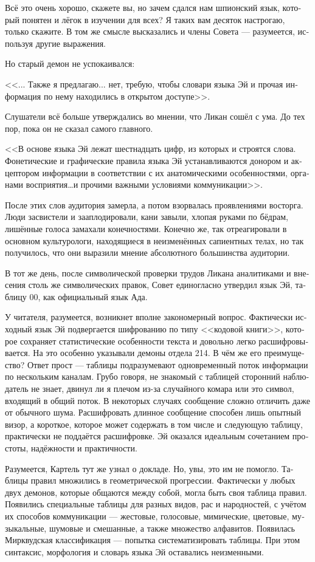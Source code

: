 \documentclass[a4paper,12pt,fleqn]{book}\usepackage{cooltooltips}\usepackage{polyglossia}\setdefaultlanguage[babelshorthands=true]{russian}\setotherlanguage{english}\defaultfontfeatures{Ligatures=TeX,Mapping=tex-text} \usepackage{xcolor}\definecolor{lightgray}{HTML}{bbbbbb}\color{lightgray}\newcommand{\ml}[3]{\textenglish{\textcolor{black}{#3}}}
\begin{document}
{Всё это очень хорошо, скажете вы, но зачем сдался нам шпионский язык, который понятен и лёгок в изучении для всех?
Я таких вам десяток настрогаю, только скажите.
В том же смысле высказались и члены Совета --- разумеется, используя другие выражения.

Но старый демон не успокаивался:

<<... Также я предлагаю... нет, требую, чтобы словари языка Эй и прочая информация по нему находились в открытом доступе>>.

Слушатели всё больше утверждались во мнении, что Ликан сошёл с ума.
До тех пор, пока он не сказал самого главного.

<<В основе языка Эй лежат шестнадцать цифр, из которых и строятся слова.
Фонетические и графические правила языка Эй устанавливаются донором и акцептором информации в соответствии с их анатомическими особенностями, органами восприятия\ldots и прочими важными условиями коммуникации>>.

После этих слов аудитория замерла, а потом взорвалась проявлениями восторга.
Люди засвистели и зааплодировали, кани завыли, хлопая руками по бёдрам, лишённые голоса замахали конечностями.
Конечно же, так отреагировали в основном культурологи, находящиеся в неизменённых сапиентных телах, но так получилось, что они выразили мнение абсолютного большинства аудитории.

В тот же день, после символической проверки трудов Ликана аналитиками и внесения столь же символических правок, Совет единогласно утвердил язык Эй, таблицу 00, как официальный язык Ада.

У читателя, разумеется, возникнет вполне закономерный вопрос.
Фактически исходный язык Эй подвергается шифрованию по типу <<кодовой книги>>, которое сохраняет статистические особенности текста и довольно легко расшифровывается.
На это особенно указывали демоны отдела 214.
В чём же его преимущество?
Ответ прост --- таблицы подразумевают одновременный поток информации по нескольким каналам.
Грубо говоря, не знакомый с таблицей сторонний наблюдатель не знает, двинул ли я плечом из-за случайного комара или это символ, входящий в общий поток.
В некоторых случаях сообщение сложно отличить даже от обычного шума.
Расшифровать длинное сообщение способен лишь опытный визор, а короткое, которое может содержать в том числе и следующую таблицу, практически не поддаётся расшифровке.
Эй оказался идеальным сочетанием простоты, надёжности и практичности.

Разумеется, Картель тут же узнал о докладе.
Но, увы, это им не помогло.
Таблицы правил множились в геометрической прогрессии.
Фактически у любых двух демонов, которые общаются между собой, могла быть своя таблица правил.
Появились специальные таблицы для разных видов, рас и народностей, с учётом их способов коммуникации --- жестовые, голосовые, мимические, цветовые, музыкальные, шумовые и смешанные, а также множество алфавитов.
Появилась Мирквудская классификация --- попытка систематизировать таблицы.
При этом синтаксис, морфология и словарь языка Эй оставались неизменными.

}
\end{document}
